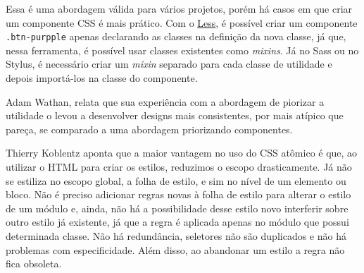\begin{Shaded}
\begin{Highlighting}[]
 \OperatorTok{=} \OperatorTok{\{}
    \OperatorTok{:}\KeywordTok{=>} \OperatorTok{\{}
        \OperatorTok{=} \OperatorTok{;}
        \NormalTok{(}\NormalTok{[}\NormalTok{])}\OperatorTok{\{}
            \NormalTok{(}\NormalTok{)}\OperatorTok{:}
\OperatorTok{=} \OperatorTok{;}
                \OperatorTok{;}
            \NormalTok{(}\NormalTok{)}\OperatorTok{:}
\OperatorTok{=} \OperatorTok{;}
                \OperatorTok{;}
        \OperatorTok{\}}
         \NormalTok{(}\SpecialCharTok{$\{}\SpecialCharTok{\}}\OperatorTok{,} \NormalTok{)}
    \OperatorTok{\}}
\OperatorTok{\}}
\end{Highlighting}
\end{Shaded}

Essa é uma abordagem válida para vários projetos, porém há casos em que
criar um componente CSS é mais prático. Com o
\href{http://lesscss.org/}{Less}, é possível criar um componente
\texttt{.btn-purpple} apenas declarando as classes na definição da nova
classe, já que, nessa ferramenta, é possível usar classes existentes
como \emph{mixins}. Já no Sass ou no Stylus, é necessário criar um
\emph{mixin} separado para cada classe de utilidade e depois importá-los
na classe do componente.

Adam Wathan, relata que sua experiência com a abordagem de piorizar a
utilidade o levou a desenvolver designs mais consistentes, por mais
atípico que pareça, se comparado a uma abordagem priorizando
componentes.

Thierry Koblentz aponta que a maior vantagem no uso do CSS atômico é
que, ao utilizar o HTML para criar os estilos, reduzimos o escopo
drasticamente. Já não se estiliza no escopo global, a folha de estilo, e
sim no nível de um elemento ou bloco. Não é preciso adicionar regras
novas à folha de estilo para alterar o estilo de um módulo e, ainda, não
há a possibilidade desse estilo novo interferir sobre outro estilo já
existente, já que a regra é aplicada apenas no módulo que possui
determinada classe. Não há redundância, seletores não são duplicados e
não há problemas com especificidade. Além disso, ao abandonar um estilo
a regra não fica obsoleta.


